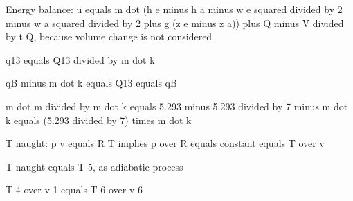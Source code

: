 Energy balance:
u equals m dot (h e minus h a minus w e squared divided by 2 minus w a squared divided by 2 plus g (z e minus z a)) plus Q minus V divided by t
Q, because volume change is not considered

q13 equals Q13 divided by m dot k

qB minus m dot k equals Q13 equals qB

m dot m divided by m dot k equals 5.293 minus 5.293 divided by 7 minus m dot k equals (5.293 divided by 7) times m dot k

T naught: p v equals R T implies p over R equals constant equals T over v

T naught equals T 5, as adiabatic process

T 4 over v 1 equals T 6 over v 6